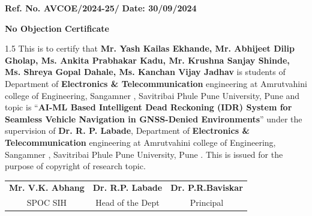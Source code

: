 \documentclass[12pt,a4paper]{article}
\begin{document}
\pagestyle{empty}

\noindent
\textbf{Ref. No. AVCOE/2024-25/} \hfill \textbf{Date: 30/09/2024}

\vspace{28pt}

\begin{center}
  {\fontsize{16}{20}\selectfont \textbf{No Objection Certificate}}
\end{center}

\vspace{32pt}

\begin{spacing}{1.5}
\noindent
This is to certify that \textbf{Mr. Yash Kailas Ekhande, Mr. Abhijeet Dilip Gholap, Ms. Ankita Prabhakar Kadu, Mr. Krushna Sanjay Shinde, Ms. Shreya Gopal Dahale, Ms. Kanchan Vijay Jadhav} is students of Department of \textbf{Electronics \& Telecommunication} engineering at Amrutvahini college of Engineering, Sangamner , Savitribai Phule Pune University, Pune  and  topic is ``\textbf{AI-ML Based Intelligent Dead Reckoning (IDR) System for Seamless Vehicle Navigation in GNSS-Denied Environments}'' under the supervision of \textbf{Dr. R. P. Labade}, Department of \textbf{Electronics \& Telecommunication} engineering at Amrutvahini college of Engineering, Sangamner , Savitribai Phule Pune University, Pune . This is issued for the purpose of copyright of research topic.
\end{spacing}

\vspace{90pt}

\noindent
\begin{tabular*}{\textwidth}{@{\extracolsep{\fill}}ccc@{}}
  \textbf{Mr. V.K. Abhang} & \textbf{Dr. R.P. Labade} & \textbf{Dr. P.R.Baviskar} \\[4pt]
  SPOC SIH & Head of the Dept & Principal
\end{tabular*}
\end{document}
